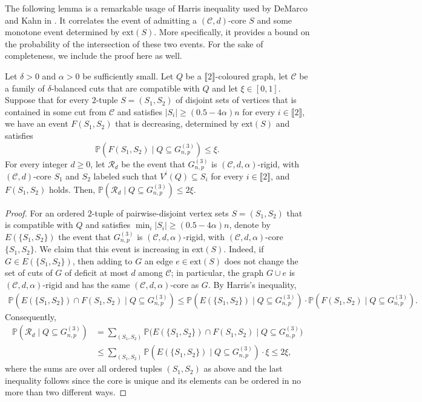 \documentclass[11pt,a4paper,oneside,reqno]{amsart}
\newcommand{\Gnp}{G_{n, p}^{(3)}}
\newcommand{\cC}{\mathcal{C}}
\newcommand{\cR}{\mathcal{R}}
\renewcommand{\Pr}{\mathbb{P}}
\newcommand{\1}{\mathbbm{1}} %
\newcommand{\br}[1]{\llbracket{#1}\rrbracket}
\renewcommand{\le}{\leqslant}
\renewcommand{\ge}{\geqslant}
\newcommand{\ext}{\mathrm{ext}}
\begin{document}
The following lemma is a remarkable usage of Harris inequality used by DeMarco and Kahn in \cite{DeMKah15Tur}. It correlates the event of admitting a $(\cC, d)$-core $S$ and some monotone event determined by $\ext(S)$. More specifically, it provides a bound on the probability of the intersection of these two events. For the sake of completeness, we include the proof here as well.

\begin{lemma}\label{lemma:correlation-lemma}
    Let $\delta > 0$ and $\alpha > 0$ be sufficiently small. Let $Q$ be a $\br{2}$-coloured graph, let $\cC$ be a family of $\delta$-balanced cuts that are compatible with $Q$ and let $\xi \in [0, 1]$. Suppose that for every $2$-tuple $S = (S_1, S_2)$ of disjoint sets of vertices that is contained in some cut from $\cC$ and satisfies $|S_i| \ge (0.5 - 4\alpha)n$ for every $i \in \br{2}$, we have an event $F(S_1, S_2)$ that is decreasing, determined by $\ext(S)$ and satisfies
    \[
        \Pr\left(F(S_1, S_2) \mid Q \subseteq \Gnp\right) \le \xi.
    \]
    For every integer $d \ge 0$, let $\cR_d$ be the event that $\Gnp$ is $(\cC, d, \alpha)$-rigid, with $(\cC, d)$-core $S_1$ and $S_2$ labeled such that $V^i(Q) \subseteq S_i$ for every $i \in \br{2}$, and $F(S_1, S_2)$ holds. Then, $\Pr\left(\cR_d \mid Q \subseteq \Gnp\right) \le 2\xi$.
\end{lemma}
\begin{proof}
    For an ordered $2$-tuple of pairwise-disjoint vertex sets $S = (S_1, S_2)$ that is compatible with $Q$ and satisfies $\min_i |S_i| \ge (0.5-4\alpha)n$, denote by $E(\{S_1, S_2\})$ the event that $\Gnp$ is $(\cC, d, \alpha)$-rigid, with $(\cC, d, \alpha)$-core $\{S_1, S_2\}$.
    We claim that this event is increasing in $\ext(S)$. Indeed, if $G \in E(\{S_1, S_2\})$, then adding to $G$ an edge $e \in \ext(S)$ does not change the set of cuts of $G$ of deficit at most $d$ among $\cC$; in particular, the graph $G \cup e$ is $(\cC, d, \alpha)$-rigid and has the same $(\cC, d, \alpha)$-core as $G$.
    By Harris's inequality,
    \begin{multline*}
        \Pr\left(E(\{S_1, S_2\}) \cap F(S_1, S_2) \mid Q \subseteq \Gnp\right) 
        \le \Pr\left(E(\{S_1, S_2\}) \mid Q \subseteq \Gnp\right) \cdot \Pr\left(F(S_1, S_2) \mid Q \subseteq \Gnp\right).
    \end{multline*}
    Consequently,
    \begin{align*}
        \Pr(\cR_d \mid Q \subseteq \Gnp)
        &= \sum_{(S_1, S_2)} \Pr\big(E(\{S_1, S_2\}) \cap F(S_1, S_2) \mid Q \subseteq \Gnp\big) \\
        &\le\sum_{(S_1, S_2)} \Pr(E(\{S_1, S_2\}) \mid Q \subseteq \Gnp) \cdot \xi
        \le 2 \xi,
    \end{align*}
    where the sums are over all ordered tuples $(S_1, S_2)$ as above and the last inequality follows since the core is unique and its elements can be ordered in no more than two different ways.
\end{proof}
\end{document}
